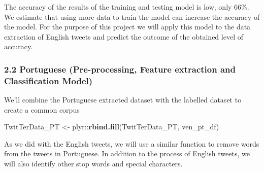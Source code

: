 \documentclass[]{article}
\newenvironment{Shaded}{\begin{snugshade}}{\end{snugshade}}
\newcommand{\KeywordTok}[1]{\textcolor[rgb]{0.13,0.29,0.53}{\textbf{{#1}}}}
\newcommand{\StringTok}[1]{\textcolor[rgb]{0.31,0.60,0.02}{{#1}}}
\newcommand{\NormalTok}[1]{{#1}}
\begin{document}
The accuracy of the results of the training and testing model is low,
only 66\%. We estimate that using more data to train the model can
increase the accuracy of the model. For the purpose of this project we
will apply this model to the data extraction of English tweets and
predict the outcome of the obtained level of accuracy.

\subsubsection{2.2 Portuguese (Pre-processing, Feature extraction and
Classification
Model)}\label{portuguese-pre-processing-feature-extraction-and-classification-model}

We'll combine the Portuguese extracted dataset with the labelled dataset
to create a common corpus

\begin{Shaded}
\begin{Highlighting}[]
\NormalTok{TwitTerData_PT <-}\StringTok{ }\NormalTok{plyr::}\KeywordTok{rbind.fill}\NormalTok{(TwitTerData_PT, ven_pt_df)}
\end{Highlighting}
\end{Shaded}

As we did with the English tweets, we will use a similar function to
remove words from the tweets in Portuguese. In addition to the process
of English tweets, we will also identify other stop words and special
characters.
\end{document}
